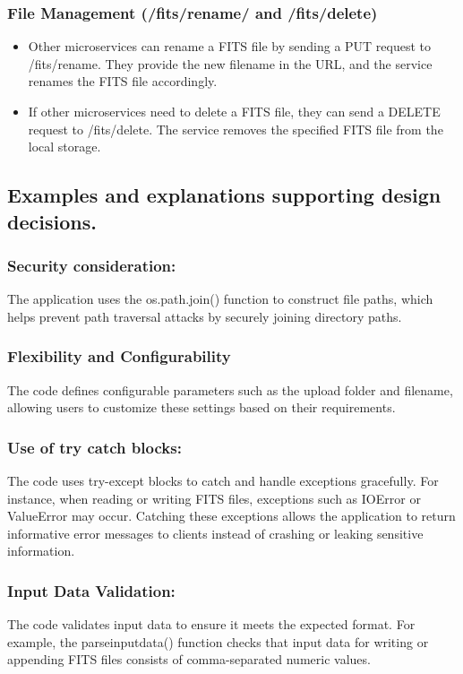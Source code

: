 \documentclass[a4paper,oneside,11pt]{book}
\begin{document}
\subsubsection{File Management ({/fits/rename/} and {/fits/delete})}
\begin{itemize}
    \item Other microservices can rename a FITS file by sending a PUT request to {/fits/rename}. They provide the new filename in the URL, and the service renames the FITS file accordingly.
    \item If other microservices need to delete a FITS file, they can send a DELETE request to {/fits/delete}. The service removes the specified FITS file from the local storage.
\end{itemize}
\subsection{Examples and explanations supporting design decisions.}
\subsubsection{Security consideration:}
The application uses the os.path.join() function to construct file paths, which helps prevent path traversal attacks by securely joining directory paths.
\subsubsection{Flexibility and Configurability}
The code defines configurable parameters such as the upload folder and filename, allowing users to customize these settings based on their requirements.
\subsubsection{Use of try catch blocks:}
The code uses try-except blocks to catch and handle exceptions gracefully. For instance, when reading or writing FITS files, exceptions such as IOError or ValueError may occur. Catching these exceptions allows the application to return informative error messages to clients instead of crashing or leaking sensitive information.
\subsubsection{Input Data Validation:}
The code validates input data to ensure it meets the expected format. For example, the parseinputdata() function checks that input data for writing or appending FITS files consists of comma-separated numeric values. 
\end{document}
